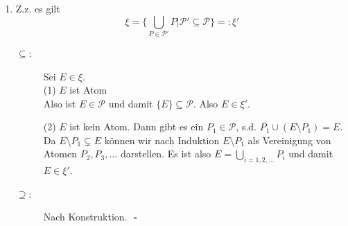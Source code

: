 \documentclass[11pt,a4paper,ngerman]{article}
\newcommand{\set}[1]{ \{ #1 \}}
\begin{document}
\begin{enumerate}[a)]
\begin{enumerate}[(1)]
\item Z.z. es gilt
\begin{equation*}\xi = \{ \bigcup_{P \in \mathcal{P'}} P | \mathcal{P'} \subseteq \mathcal{P} \} =: \xi' \end{equation*}

\begin{description}
\item[$\subseteq$:] Sei $E \in \xi$. \\
(1) $E$ ist Atom \\
Also ist $E \in \mathcal{P}$ und damit $\set{E} \subseteq \mathcal{P}$. Also $E \in \xi'$.

(2) $E$ ist kein Atom. Dann gibt es ein $P_1 \in \mathcal{P}$, s.d. $P_1 \cup (E \setminus P_1) = E$. Da $E \setminus P_1 \subsetneq E$ können wir nach Induktion $E \setminus P_1$ als Vereinigung von Atomen $P_2,P_3,\ldots$ darstellen. Es ist also $E = \bigcup_{i = 1,2,\ldots}P_i$ und damit $E \in \xi'$.
\item[$\supseteq$:] Nach Konstruktion. $\mbox{}$ \hfill $\square$
\end{description}

%
%
\end{enumerate}
\end{enumerate}
\end{document}
